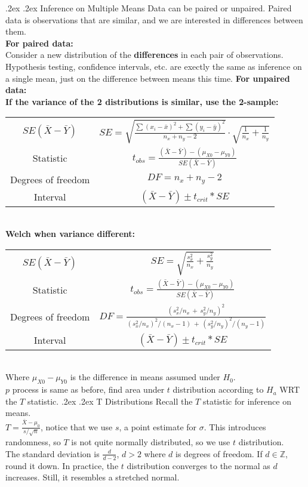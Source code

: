 \documentclass[10pt,landscape]{article}
\makeatletter
\renewcommand{\subsection}{\@startsection{subsection}{2}{0mm}%
                                {.2ex}%
                                {.2ex}%
                                {\normalfont\normalsize\bfseries}}
\makeatother
\begin{document}
\begin{multicols}{3}
\subsection{Inference on Multiple Means}
Data can be paired or unpaired. 
Paired data is observations that are similar, and we are interested in differences between them. \\
\textbf{For paired data:} \\
Consider a new distribution of the \textbf{differences} in each pair of observations. \\
Hypothesis testing, confidence intervals, etc. are exectly the same as inference on a single mean, just on the difference between means this time.
\textbf{For unpaired data:} \\ 
\textbf{If the variance of the 2 distributions is similar, use the 2-sample:}
\begin{tabular}{@{}c@{}|@{}c@{}}
        \hline
$SE(\bar{X}-\bar{Y})$ & $SE=\sqrt{\frac{\sum(x_i-\bar{x})^2+\sum(y_i-\bar{y})^2}{n_x+n_y-2}}\cdot\sqrt{\frac1{n_x}+\frac1{n_y}}$   \\
Statistic & $t_{obs}=\frac{(\bar{X}-\bar{Y})-(\mu_{X0}-\mu_{Y0})}{SE(\bar{X}-\bar{Y})}$  \\
Degrees of freedom & $\textstyle DF=n_x+n_y-2$   \\
Interval & $(\bar{X}-\bar{Y})\pm t_{crit}*SE$   \\
\end{tabular} \\
\textbf{Welch when variance different:} \\
\begin{tabular}{@{}c@{}|@{}c@{}}
        \hline
$SE(\bar{X}-\bar{Y})$ & $SE=\sqrt{\frac{s_x^2}{n_x}+\frac{s_y^2}{n_y}}$  \\
Statistic & $t_{obs}=\frac{(\bar{X}-\bar{Y})-(\mu_{X0}-\mu_{Y0})}{SE(\bar{X}-\bar{Y})}$  \\
Degrees of freedom & $DF=\frac{(s_x^2/n_x\,+\,s_y^2/n_y)^2}{(s_x^2/n_x)^2/(n_x-1)\,+\,(s_y^2/n_y)^2/(n_y-1)}$  \\
Interval & $(\bar{X}-\bar{Y})\pm t_{crit}*SE$  \\
\end{tabular} \\
Where $\mu_{X0} - \mu_{Y0}$ is the difference in means assumed under $H_0$. \\
$p$ process is same as before, find area under $t$ distribution according to $H_a$ WRT the $T$ statistic.
\subsection{T Distributions}
Recall the $T$ statistic for inference on means. \\
$T = \frac{\bar{X} - \mu_0}{s / \sqrt{n}}$, notice that we use $s$, a point estimate for $\sigma$.
This introduces randomness, so $T$ is not quite normally distributed, so we use $t$ distribution. \\
The standard deviation is $\frac{d}{d-2}$, $d > 2$ where $d$ is degrees of freedom. If $d \in \mathbb{Z}$, round it down. 
In practice, the $t$ distribution converges to the normal as $d$ increases. Still, it resembles a stretched normal. 


\end{multicols}
\end{document}
